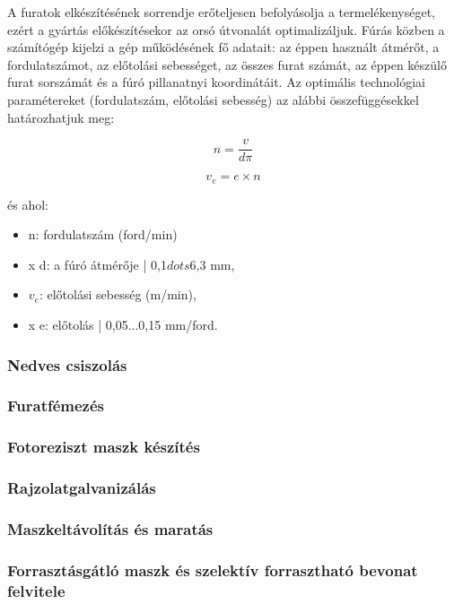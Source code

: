\documentclass[12pt]{article}
\begin{document}
		A furatok elkészítésének sorrendje erőteljesen befolyásolja a termelékenységet, ezért a gyártás előkészítésekor az orsó útvonalát optimalizáljuk. Fúrás közben a számítógép kijelzi a gép működésének fő adatait: az éppen használt átmérőt, a fordulatszámot, az előtolási sebességet, az összes furat számát, az éppen készülő furat sorszámát és a fúró pillanatnyi koordinátáit. Az optimális technológiai paramétereket (fordulatszám, előtolási sebesség) az alábbi összefüggésekkel határozhatjuk meg:

		\[n = \frac{v}{d\pi} \]

		\[v_e = e \times n \]

		és ahol:

		\begin{itemize}
			\item{n: fordulatszám (ford/min)}
			\item{x d: a fúró átmérője | 0,1$dots$6,3 mm,}
			\item{$v_e$: előtolási sebesség (m/min),}
			\item{x e: előtolás | 0,05...0,15 mm/ford.}
		\end{itemize}

		\subsubsection{Nedves csiszolás}

		\subsubsection{Furatfémezés}
		
		\subsubsection{Fotoreziszt maszk készítés}
		
		\subsubsection{Rajzolatgalvanizálás}

		\subsubsection{Maszkeltávolítás és maratás}

		\subsubsection{Forrasztásgátló maszk és szelektív forrasztható bevonat felvitele}
\end{document}
